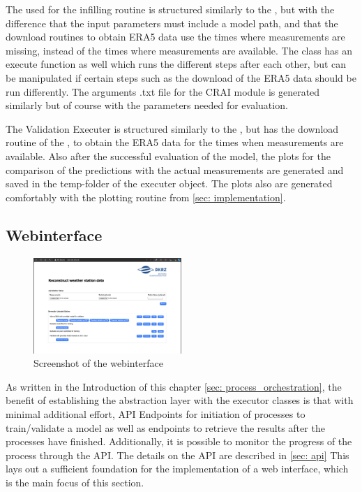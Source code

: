 The  used for the infilling routine is structured similarly to the , but with the difference that the input parameters must include a model path, and that the download routines to obtain ERA5 data use the times where measurements are missing, instead of the times where measurements are available. The class has an execute function as well which runs the different steps after each other, but can be manipulated if certain steps such as the download of the ERA5 data should be run differently. The arguments .txt file for the CRAI module is generated similarly but of course with the parameters needed for evaluation.

The Validation Executer is structured similarly to the , but has the download routine of the , to obtain the ERA5 data for the times when measurements are available. Also after the successful evaluation of the model, the plots for the comparison of the predictions with the actual measurements are generated and saved in the temp-folder of the executer object. The plots also are generated comfortably with the plotting routine from \autoref{sec: implementation}.

\subsection{Webinterface}

\begin{figure}
    \centering
    \includegraphics[width=0.5\textwidth]{resources/images/webinterface_screenshot.png}
    \caption{Screenshot of the webinterface}
    \label{fig: webinterface_screenshot}
\end{figure}

As written in the Introduction of this chapter \ref{sec: process_orchestration}, the benefit of establishing the abstraction layer with the executor classes is that with minimal additional effort, API Endpoints for initiation of processes to train/validate a model as well as endpoints to retrieve the results after the processes have finished. Additionally, it is possible to monitor the progress of the process through the API. The details on the API are described in \autoref{sec: api} This lays out a sufficient foundation for the implementation of a web interface, which is the main focus of this section.

